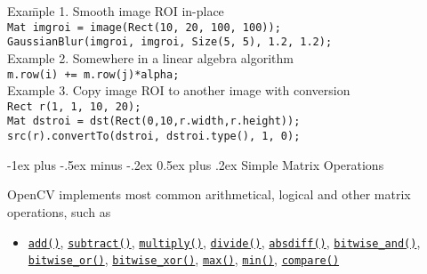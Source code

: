 \documentclass[10pt,landscape]{article}
\makeatletter
\renewcommand{\section}{\@startsection{section}{1}{0mm}%
                                {-1ex plus -.5ex minus -.2ex}%
                                {0.5ex plus .2ex}%
                                {\normalfont\large\bfseries}}
\makeatother
\begin{document}
\begin{multicols}{3}
\begin{tabular}{@{}p{\the\MyLen}%
                @{}p{\linewidth-\the\MyLen}@{}}
\end{tabular}

\begin{tabbing}
Exa\=mple 1. Smooth image ROI in-place\\
\>\texttt{Mat imgroi = image(Rect(10, 20, 100, 100));}\\
\>\texttt{GaussianBlur(imgroi, imgroi, Size(5, 5), 1.2, 1.2);}\\
Example 2. Somewhere in a linear algebra algorithm \\
\>\texttt{m.row(i) += m.row(j)*alpha;}\\
Example 3. Copy image ROI to another image with conversion\\
\>\texttt{Rect r(1, 1, 10, 20);}\\
\>\texttt{Mat dstroi = dst(Rect(0,10,r.width,r.height));}\\
\>\texttt{src(r).convertTo(dstroi, dstroi.type(), 1, 0);}\\
\end{tabbing}

\section{Simple Matrix Operations}

OpenCV implements most common arithmetical, logical and
other matrix operations, such as

\begin{itemize}
\item
\texttt{\href{http://opencv.willowgarage.com/documentation/cpp/core_operations_on_arrays.html\#cv-add}{add()}},  \texttt{\href{http://opencv.willowgarage.com/documentation/cpp/core_operations_on_arrays.html\#cv-subtract}{subtract()}},
\texttt{\href{http://opencv.willowgarage.com/documentation/cpp/core_operations_on_arrays.html\#cv-multiply}{multiply()}},
\texttt{\href{http://opencv.willowgarage.com/documentation/cpp/core_operations_on_arrays.html\#cv-divide}{divide()}},
\texttt{\href{http://opencv.willowgarage.com/documentation/cpp/core_operations_on_arrays.html\#cv-absdiff}{absdiff()}},
\texttt{\href{http://opencv.willowgarage.com/documentation/cpp/core_operations_on_arrays.html\#bitwise-and}{bitwise\_and()}},  \texttt{\href{http://opencv.willowgarage.com/documentation/cpp/core_operations_on_arrays.html\#bitwise-or}{bitwise\_or()}},
\texttt{\href{http://opencv.willowgarage.com/documentation/cpp/core_operations_on_arrays.html\#bitwise-xor}{bitwise\_xor()}},
\texttt{\href{http://opencv.willowgarage.com/documentation/cpp/core_operations_on_arrays.html\#cv-max}{max()}},
\texttt{\href{http://opencv.willowgarage.com/documentation/cpp/core_operations_on_arrays.html\#cv-min}{min()}},
\texttt{\href{http://opencv.willowgarage.com/documentation/cpp/core_operations_on_arrays.html\#cv-compare}{compare()}}


\end{itemize}
\end{multicols}
\end{document}
